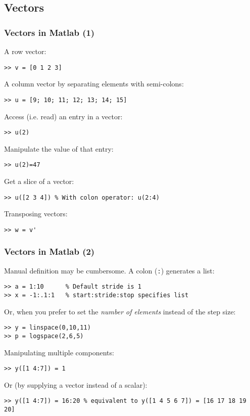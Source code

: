 \subsection*{Vectors}
\begin{frame}[fragile]
  \frametitle{Vectors in Matlab (1)}
  A row vector:
  \begin{lstlisting}
>> v = [0 1 2 3]
  \end{lstlisting}\pause
  A column vector by separating elements with semi-colons:
  \begin{lstlisting}
>> u = [9; 10; 11; 12; 13; 14; 15]
  \end{lstlisting}\pause
  Access (i.e. read) an entry in a vector:
  \begin{lstlisting}
>> u(2)
  \end{lstlisting}\pause
  Manipulate the value of that entry:
  \begin{lstlisting}
>> u(2)=47
  \end{lstlisting}\pause
  Get a slice of a vector:
  \begin{lstlisting}
>> u([2 3 4]) % With colon operator: u(2:4)
  \end{lstlisting}\pause
  Transposing vectors:
  \begin{lstlisting}
>> w = v'
  \end{lstlisting}
\end{frame}

\begin{frame}[fragile]
  \frametitle{Vectors in Matlab (2)}
  Manual definition may be cumbersome. A colon (\lstinline$:$) generates a list:
  \begin{lstlisting}
>> a = 1:10      % Default stride is 1
>> x = -1:.1:1   % start:stride:stop specifies list
  \end{lstlisting}\pause
  Or, when you prefer to set the \emph{number of elements} instead of the step size:
  \begin{lstlisting}
>> y = linspace(0,10,11)
>> p = logspace(2,6,5)
  \end{lstlisting}\pause
  Manipulating multiple components:
  \begin{lstlisting}
>> y([1 4:7]) = 1
  \end{lstlisting}\pause
  Or (by supplying a vector instead of a scalar):
  \begin{lstlisting}
>> y([1 4:7]) = 16:20 % equivalent to y([1 4 5 6 7]) = [16 17 18 19 20]
  \end{lstlisting}
\end{frame}

